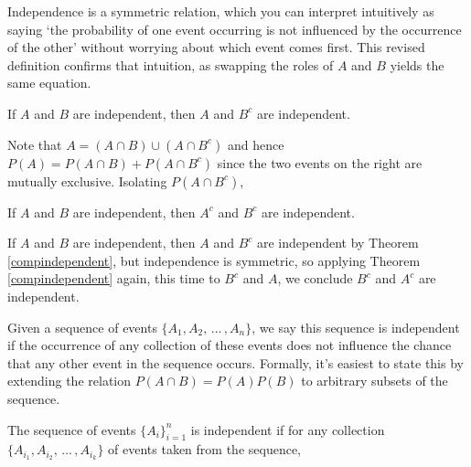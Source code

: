 \rmk Independence is a symmetric relation, which you can interpret intuitively as saying `the probability of one event occurring is not influenced by the occurrence of the other' without worrying about which event comes first. This revised definition confirms that intuition, as swapping the roles of $A$ and $B$ yields the same equation.
\begin{thm}\label{compindependent}
If $A$ and $B$ are independent, then $A$ and $B^c$ are independent.
\end{thm}
\begin{pf}
Note that $A = (A \cap B) \cup (A \cap B^c)$ and hence $P(A) = P(A \cap B) + P(A \cap B^c)$ since the two events on the right are mutually exclusive. Isolating $P(A \cap B^c)$,
\end{pf}
\begin{cor}
If $A$ and $B$ are independent, then $A^c$ and $B^c$ are independent.
\end{cor}
\begin{pf}
If $A$ and $B$ are independent, then $A$ and $B^c$ are independent by Theorem \ref{compindependent}, but independence is symmetric, so applying Theorem \ref{compindependent} again, this time to $B^c$ and $A$, we conclude $B^c$ and $A^c$ are independent.
\end{pf}
\par
Given a sequence of events $\{A_1, A_2, \, ... \, , A_n\}$, we say this sequence is independent if the occurrence of any collection of these events does not influence the chance that any other event in the sequence occurs. Formally, it's easiest to state this by extending the relation $P(A \cap B) = P(A)P(B)$ to arbitrary subsets of the sequence.
\begin{defn}
The sequence of events $\{A_i\}_{i=1}^{n}$ is independent if for any collection $\{A_{i_1}, A_{i_2}, \, ... \, , A_{i_k}\}$ of events taken from the sequence,
\end{defn}
